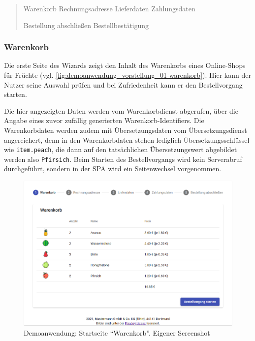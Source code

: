 \begin{quotation}
	\begin{flushleft}
		Warenkorb \textrightarrow{} Rechnungsadresse  \textrightarrow{} Lieferdaten \textrightarrow{} Zahlungsdaten
	\par{}
	\end{flushleft}
	\begin{flushright}
		 \textrightarrow{} Bestellung abschließen \textrightarrow{} Bestellbestätigung
	\end{flushright}
\end{quotation}

\subsubsection{Warenkorb}

Die erste Seite des Wizards zeigt den Inhalt des Warenkorbs eines Online-Shops für Früchte (vgl. \autoref{fig:demoanwendung_vorstellung_01-warenkorb}). Hier kann der Nutzer seine Auswahl prüfen und bei Zufriedenheit kann er den Bestellvorgang starten.

Die hier angezeigten Daten werden vom Warenkorbdienst abgerufen, über die Angabe eines zuvor zufällig generierten Warenkorb-Identifiers. Die Warenkorbdaten werden zudem mit Übersetzungsdaten vom Übersetzungsdienst angereichert, denn in den Warenkorbdaten stehen lediglich Übersetzungsschlüssel wie \texttt{item.peach}, die dann auf den tatsächlichen Übersetzungswert abgebildet werden also \texttt{Pfirsich}. Beim Starten des Bestellvorgangs wird kein Serverabruf durchgeführt, sondern in der SPA wird ein Seitenwechsel vorgenommen.

\begin{figure}[H]
	\centering
	\includegraphics[width=1.00\linewidth]{img/04_erstellung-poc/demoanwendung_vorstellung_01-warenkorb_more-items.png}
	\caption{Demoanwendung: Startseite \enquote{Warenkorb}. Eigener Screenshot}
	\label{fig:demoanwendung_vorstellung_01-warenkorb}
\end{figure}

